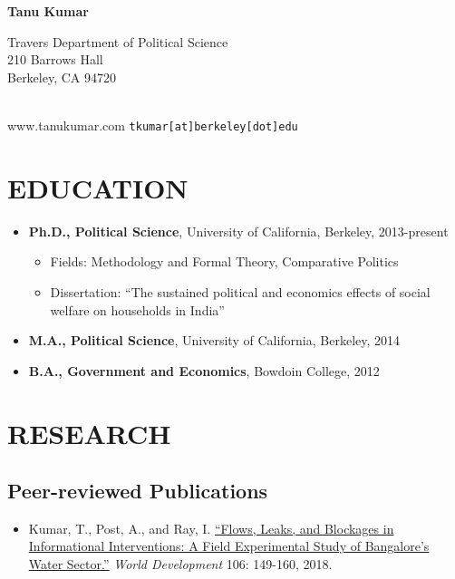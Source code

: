 \documentclass[12pt]{article}
\begin{document}
\thispagestyle{empty}
\begin{center}
\textbf{\Huge{Tanu Kumar}}
\end{center}

\begin{minipage}[t]{0.5\textwidth}
Travers Department of Political Science\\
210 Barrows Hall\\
Berkeley, CA 94720\\ \\
\end{minipage}
\begin{minipage}[t]{0.5\textwidth}
\begin{flushright}
www.tanukumar.com
\texttt{tkumar[at]berkeley[dot]edu}
\end{flushright}\end{minipage}
\section*{EDUCATION}

	\begin{itemize}[nosep]
		\item[] \textbf{Ph.D., Political Science}, University of California, Berkeley, 2013-present
		\begin{itemize}[nosep]
	\item[] Fields: Methodology and Formal Theory, Comparative Politics
	\item[] Dissertation: ``The sustained political and economics effects of social welfare on households in India''
\end{itemize}
	\item[]  \textbf{M.A., Political Science}, University of California, Berkeley, 2014
	\item[] \textbf{B.A., Government and Economics}, Bowdoin College, 2012

\end{itemize}	
\vspace{5mm}
\section*{RESEARCH}

\subsection*{Peer-reviewed Publications}
\begin{itemize}
		\item[] Kumar, T., Post, A., and Ray, I. \href{https://www.sciencedirect.com/science/article/pii/S0305750X18300329}{``Flows, Leaks, and Blockages in Informational Interventions: A Field Experimental Study of Bangalore's Water Sector.''} \textit{World Development} 106: 149-160, 2018.
\end{itemize}
\end{document}
